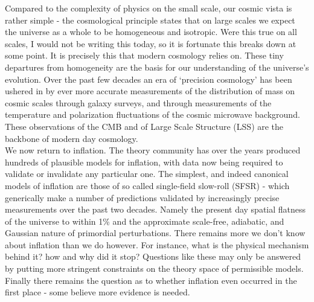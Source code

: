 \documentclass[a4paper,10pt]{article}
\begin{document}
Compared to the complexity of physics on the small scale, our cosmic vista is rather simple - the cosmological principle states that on large scales we expect the universe as a whole to be homogeneous and isotropic. Were this true on all scales, I would not be writing this today, so it is fortunate this breaks down at some point. It is precisely this that modern cosmology relies on. These tiny departures from homogeneity are the basis for our understanding of the universe's evolution. Over the past few decades an era of `precision cosmology' has been ushered in by ever more accurate measurements of the distribution of mass on cosmic scales through galaxy surveys, and through measurements of the temperature and polarization fluctuations of the cosmic microwave background. These observations of the CMB and of Large Scale Structure (LSS) are the backbone of modern day cosmology.\\

We now return to inflation. The theory community has over the years produced hundreds of plausible models for inflation, with data now being required to validate or invalidate any particular one. The simplest, and indeed canonical models of inflation are those of so called single-field slow-roll (SFSR) - which generically make a number of predictions validated by increasingly precise measurements over the past two decades. Namely the present day spatial flatness of the universe to within 1\% and the approximate scale-free, adiabatic, and Gaussian nature of primordial perturbations. There remains more we don't know about inflation than we do however. For instance, what is the physical mechanism behind it? how and why did it stop? Questions like these may only be answered by putting more stringent constraints on the theory space of permissible models. Finally there remains the question as to whether inflation even occurred in the first place - some believe more evidence is needed.\\
\end{document}
